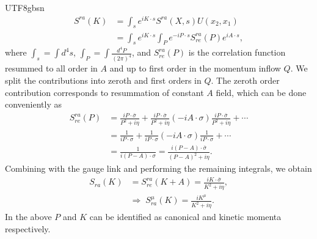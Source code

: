 \documentclass[11pt]{article}\def\baselinestretch{1.4}
\def\h{\eta}
\def\m{{\mu}}
\def\s{{\sigma}}
\begin{document}
\begin{CJK}{UTF8}{gbsn}
\begin{align}
S^{ra}(K) &= \int_s e^{iK \cdot s} S^{ra}(X,s)U(x_2,x_1) \nonumber\\
&= \int_s e^{iK \cdot s} \int_P e^{-iP \cdot s} S^{ra}_{re}(P)e^{iA \cdot s},
\end{align}
where $\int_s= \int d^4s$, $\int_P= \int \frac{d^4P}{(2\pi )^4}$, and $S^{ra}_{re}(P)$ is the correlation function resummed to all order in $A$ and up to first order in the momentum inflow $Q$. We split the contributions into zeroth and first orders in $Q$. The zeroth order contribution corresponds to resummation of constant $A$ field, which can be done conveniently as 
\begin{align}
S_{re}^{ra}(P)&=\frac{iP\cdot\bar{\s}}{P^2+i\h}+\frac{iP\cdot\bar{\s}}{P^2+i\h}(-iA\cdot\s)\frac{iP\cdot\bar{\s}}{P^2+i\h}+\cdots\nonumber\\
&=\frac{1}{iP\cdot\s}+\frac{1}{iP\cdot\s}(-iA\cdot\s)\frac{1}{iP\cdot\s}+\cdots\nonumber\\
&=\frac{1}{i(P-A)\cdot\s}=\frac{i(P-A)\cdot\bar{\s}}{(P-A)^2+i\h}.
\end{align}
Combining with the gauge link and performing the remaining integrals, we obtain
\begin{align}\label{O1}
S_{ra}(K)&=S_{re}^{ra}(K+A)=\frac{iK\cdot\bar{\s}}{K^2+i\h},\nonumber\\
&\Rightarrow\; S_{ra}^\m(K)=\frac{iK^\m}{K^2+i\h}.
\end{align}
In the above $P$ and $K$ can be identified as canonical and kinetic momenta respectively.


\end{CJK}
\end{document}
